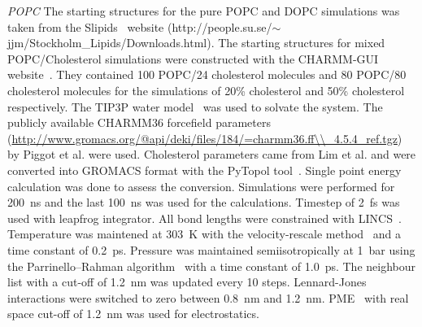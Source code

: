 \documentclass[journal=jacsat,manuscript=article]{achemso}
\begin{document}
{\it POPC}
The starting structures for the pure POPC and DOPC simulations was taken from the Slipids~\cite{jambeck12b} website (http://people.su.se/$\sim$jjm/Stockholm\_Lipids/Downloads.html).
The starting structures for mixed POPC/Cholesterol simulations were constructed with the CHARMM-GUI website~\cite{jo08}. 
They contained 100 POPC/24 cholesterol molecules and 80 POPC/80 cholesterol molecules for
the simulations of 20\% cholesterol and 50\% cholesterol respectively. The TIP3P water model~\cite{jorgensen83} was used to
solvate the system.
The publicly available CHARMM36 forcefield parameters (\url{http://www.gromacs.org/@api/deki/files/184/=charmm36.ff\\\_4.5.4\_ref.tgz}) 
by Piggot et al. \cite{piggot12} were used. Cholesterol parameters came
from Lim et al. \cite{lim12} and were converted into GROMACS format with the PyTopol tool~\cite{salari15}.  
Single point energy calculation was done to assess the conversion. 
Simulations were performed for 200~ns and the last 100~ns was used for the calculations. Timestep of 2~fs was
used with leapfrog integrator. All bond lengths were constrained with LINCS~\cite{hess97,hess07}. Temperature was maintened at
303~K with the velocity-rescale method~\cite{bussi07} and a time constant of 0.2~ps. Pressure was maintained semiisotropically
at 1~bar using the Parrinello--Rahman algorithm~\cite{parrinello81} with a time constant of 1.0~ps. The neighbour list with a cut-off of 1.2~nm
was updated every 10 steps. Lennard-Jones interactions were switched to zero
between 0.8~nm and 1.2~nm. PME~\cite{darden93,essman95} with real space cut-off of 1.2~nm was used for electrostatics.
\end{document}
